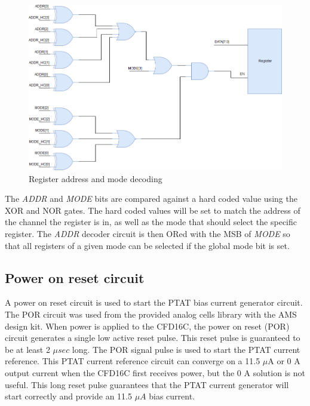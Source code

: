 \documentclass[12pt,oneside,final]{siuethesis}
\theoremstyle{definition}
\begin{document}
\begin{figure}[htbp!]
 \centering
 \includegraphics[scale=.45,keepaspectratio=true]{./ch3_figures/Register.png}
 \caption{Register address and mode decoding}
 \label{fig:register}
\end{figure}

\par The \emph{ADDR} and \emph{MODE} bits are compared against a hard coded value using the XOR and NOR gates. The hard coded values will be set to match the address of the channel the register is in, as well as the mode that should select the specific register. The \emph{ADDR} decoder circuit is then ORed with the MSB of \emph{MODE} so that all registers of a given mode can be selected if the global mode bit is set.

\subsection{Power on reset circuit}
\par A power on reset circuit is used to start the PTAT bias current generator circuit. The POR circuit was used from the provided analog cells library with the AMS design kit. When power is applied to the CFD16C, the power on reset (POR) circuit generates a single low active reset pulse. This reset pulse is guaranteed to be at least 2 $\mu sec$ long. The POR signal pulse is used to start the PTAT current reference. This PTAT current reference circuit can converge on a 11.5 $\mu$A or 0 A output current when the CFD16C first receives power, but the 0 A solution is not useful. This long reset pulse guarantees that the PTAT current generator will start correctly and provide an 11.5 $\mu A$ bias current.
\end{document}
